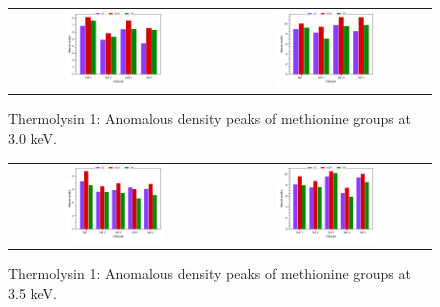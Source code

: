 \begin{figure}
    \centering
    \begin{tabular}{cc}
        \includegraphics[width = 0.5\textwidth]{plots/exp1/tlys_9_P6122/peaks/3p0_met120.pdf} & \includegraphics[width = 0.5\textwidth]{plots/exp1/tlys_9_P6122/peaks/3p0_met250.pdf}
    \end{tabular}
    \caption{Thermolysin 1: Anomalous density peaks of methionine groups at 3.0 \unit{keV}.}
    \label{fig:tlys9_met_peaks_3p0}
\end{figure}

\begin{figure}
    \centering
    \begin{tabular}{cc}
        \includegraphics[width = 0.5\textwidth]{plots/exp1/tlys_9_P6122/peaks/3p5_met120.pdf} & \includegraphics[width = 0.5\textwidth]{plots/exp1/tlys_9_P6122/peaks/3p5_met250.pdf}
    \end{tabular}
    \caption{Thermolysin 1: Anomalous density peaks of methionine groups at 3.5 \unit{keV}.}
    \label{fig:tlys9_met_peaks_3p5}
\end{figure}

